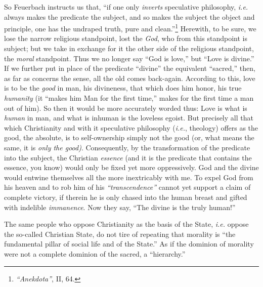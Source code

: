 So Feuerbach instructs us that, ``if one only \textit{inverts} speculative 
philosophy, \textit{i.e.} always makes the predicate the subject, and so makes 
the subject the object and principle, one has the undraped truth, pure and 
clean.''\footnote{\textit{``Anekdota''}, II, 64.} Herewith, to be sure, we 
lose the narrow religious standpoint, lost the \textit{God}, who from this 
standpoint is subject; but we take in exchange for it the other side of the 
religious standpoint, the \textit{moral} standpoint. Thus we no longer say 
``God is love,'' but ``Love is divine.'' If we further put in place of the 
predicate ``divine'' the equivalent ``sacred,'' then, as far as concerns 
the sense, all the old comes back-again. According to this, love is to be the 
\textit{good} in man, his divineness, that which does him honor, his true 
\textit{humanity} (it ``makes him Man for the first time,'' makes for the 
first time a man out of him). So then it would be more accurately worded thus: 
Love is what is \textit{human} in man, and what is inhuman is the loveless 
egoist. But precisely all that which Christianity and with it speculative 
philosophy (\textit{i.e.}, theology) offers as the good, the absolute, is to 
self-ownership simply not the good (or, what means the same, it is 
\textit{only the good)}. Consequently, by the transformation of the predicate 
into the subject, the Christian \textit{essence} (and it is the predicate that 
contains the essence, you know) would only be fixed yet more oppressively. God 
and the divine would entwine themselves all the more inextricably with me. To 
expel God from his heaven and to rob him of his \textit{``transcendence''} 
cannot yet support a claim of complete victory, if therein he is only chased 
into the human breast and gifted with indelible \textit{immanence}. Now they 
say, ``The divine is the truly human!''

The same people who oppose Christianity as the basis of the State, 
\textit{i.e.} oppose the so-called Christian State, do not tire of repeating 
that morality is ``the fundamental pillar of social life and of the State.'' 
As if the dominion of morality were not a complete dominion of the sacred, a 
``hierarchy.''


